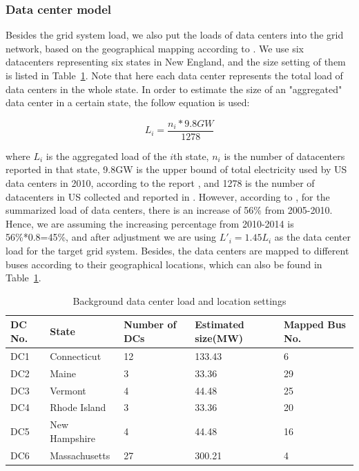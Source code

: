 \subsubsection{Data center model}
Besides the grid system load, we also put the loads of data centers into the grid network, based on the geographical mapping according to \cite{DCmap}. We use six datacenters representing six states in New England, and the size setting of them is listed in Table~\ref{tab:dc_setting}. Note that here each data center represents the total load of data centers in the whole state. In order to estimate the size of an "aggregated" data center in a certain state, the follow equation is used:

\begin{equation}
L_i=\frac{n_i*9.8GW}{1278}
\end{equation}

\noindent where $L_i$ is the aggregated load of the $i$th state, $n_i$ is the number of datacenters reported in that state,  9.8GW is the upper bound of total electricity used by US data centers in 2010, according to the report \cite{Koomey2011}, and 1278 is the number of datacenters in US collected and reported in \cite{DCmap}. However, according to \cite{Koomey2011}, for the summarized load of data centers, there is an increase of 56\% from 2005-2010. Hence, we are assuming the increasing percentage from 2010-2014 is 56\%*0.8=45\%, and after adjustment we are using $L'_i=1.45L_i$ as the data center load for the target grid system. Besides, the data centers are mapped to different buses according to their geographical locations, which can also be found in Table~\ref{tab:dc_setting}.

\begin{table}[ht]
\begin{center}
\caption{Background data center load and location settings}
\begin{tabular}{|l|l|p{30pt}|p{30pt}|p{30pt}|}
\hline
DC No. & State & Number of DCs & Estimated size(MW) & Mapped Bus No.\\
\hline
DC1 & Connecticut & 12 &133.43 & 6\\
DC2 & Maine & 3 &33.36 & 29 \\
DC3 & Vermont & 4 &44.48 & 25 \\
DC4 & Rhode Island & 3 &33.36 & 20\\
DC5 & New Hampshire & 4& 44.48 & 16\\
DC6 & Massachusetts & 27& 300.21 & 4 \\
\hline

\end{tabular}
   \vspace{.05in}
\label{tab:dc_setting}
\end{center}
\end{table}


